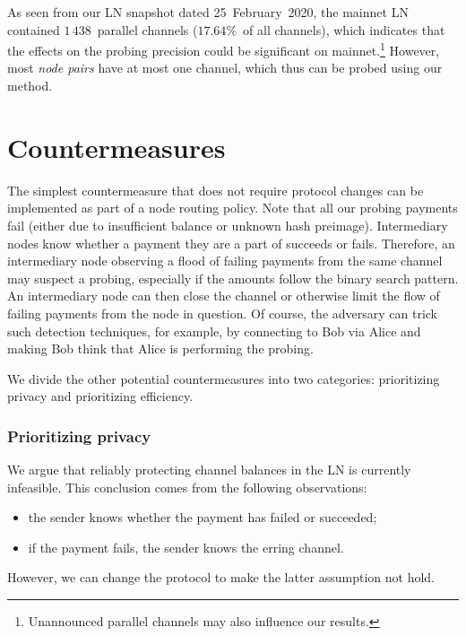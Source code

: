 As seen from our LN snapshot dated 25~February~2020, the mainnet LN contained $1\,438$~parallel channels ($17.64\%$~of all channels), which indicates that the effects on the probing precision could be significant on mainnet.\footnote{Unannounced parallel channels may also influence our results.}
However, most \textit{node pairs} have at most one channel, which thus can be probed using our method.


\section{Countermeasures}

The simplest countermeasure that does not require protocol changes can be implemented as part of a node routing policy.
Note that all our probing payments fail (either due to insufficient balance or unknown hash preimage).
Intermediary nodes know whether a payment they are a part of succeeds or fails.
Therefore, an intermediary node observing a flood of failing payments from the same channel may suspect a probing, especially if the amounts follow the binary search pattern.
An intermediary node can then close the channel or otherwise limit the flow of failing payments from the node in question.
Of course, the adversary can trick such detection techniques, for example, by connecting to Bob via Alice and making Bob think that Alice is performing the probing.

We divide the other potential countermeasures into two categories: prioritizing privacy and prioritizing efficiency.


\subsubsection*{Prioritizing privacy}

We argue that reliably protecting channel balances in the LN is currently infeasible.
This conclusion comes from the following observations:
\begin{itemize}
	\item the sender knows whether the payment has failed or succeeded;
	\item if the payment fails, the sender knows the erring channel.
\end{itemize}
However, we can change the protocol to make the latter assumption not hold.


